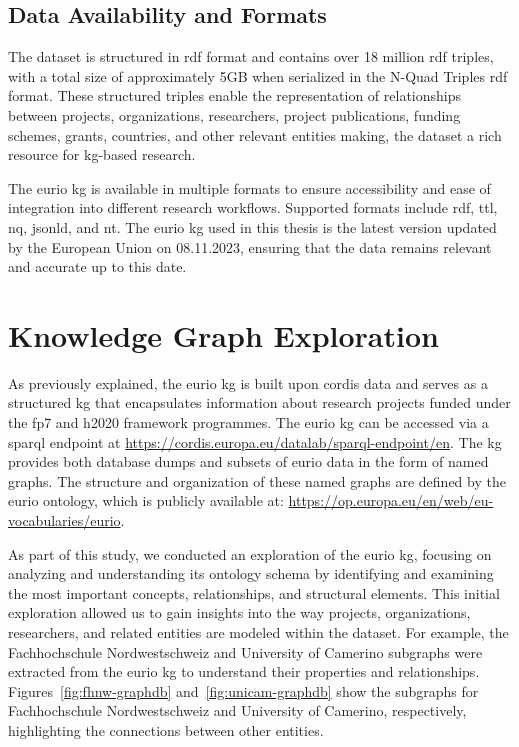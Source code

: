 \subsection*{Data Availability and Formats}
The dataset is structured in \gls{rdf} format and contains over 18 million \gls{rdf} triples, with a total size of approximately 5GB when serialized in the N-Quad Triples \gls{rdf} format.
These structured triples enable the representation of relationships between projects, organizations, researchers, project publications, funding schemes, grants, countries, and other relevant entities making, the dataset a rich resource for \gls{kg}-based research.

The \gls{eurio} \gls{kg} is available in multiple formats to ensure accessibility and ease of integration into different research workflows.
Supported formats include \gls{rdf}, \gls{ttl}, \gls{nq}, \gls{jsonld}, and \gls{nt}.
The \gls{eurio} \gls{kg} used in this thesis is the latest version updated by the European Union on 08.11.2023, ensuring that the data remains relevant and accurate up to this date.

\section*{Knowledge Graph Exploration}
As previously explained, the \gls{eurio} \acrlong{kg} \cite{CORDIS_EURIO_2022} is built upon \gls{cordis} data and serves as a structured \gls{kg} that encapsulates information about research projects funded under the \gls{fp7} and \gls{h2020} framework programmes.
The \gls{eurio} \gls{kg} can be accessed via a \gls{sparql} endpoint at \url{https://cordis.europa.eu/datalab/sparql-endpoint/en}.
The \gls{kg} provides both database dumps and subsets of \gls{eurio} data in the form of named graphs.
The structure and organization of these named graphs are defined by the \gls{eurio} ontology, which is publicly available at: \url{https://op.europa.eu/en/web/eu-vocabularies/eurio}.

As part of this study, we conducted an exploration of the \gls{eurio} \gls{kg}, focusing on analyzing and understanding its ontology schema by identifying and examining the most important concepts, relationships, and structural elements.
This initial exploration allowed us to gain insights into the way projects, organizations, researchers, and related entities are modeled within the dataset.
For example, the Fachhochschule Nordwestschweiz and University of Camerino  subgraphs were extracted from the \gls{eurio} \gls{kg} to understand their properties and relationships.
Figures~\ref{fig:fhnw-graphdb} and~\ref{fig:unicam-graphdb} show the subgraphs for Fachhochschule Nordwestschweiz and University of Camerino, respectively, highlighting the connections between other entities.

